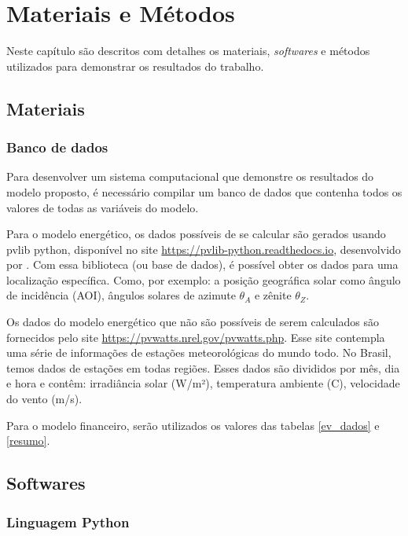 \chapter{Materiais e Métodos}\label{desenvolvimento}

Neste capítulo são descritos com detalhes os materiais, \textit{softwares} e métodos utilizados para demonstrar os resultados do trabalho.

\section{Materiais}

\subsection{Banco de dados}

Para desenvolver um sistema computacional que demonstre os resultados do modelo proposto, é necessário compilar um banco de dados que contenha todos os valores de todas as variáveis do modelo.

Para o modelo energético, os dados possíveis de se calcular são gerados usando pvlib python, disponível no site \url{https://pvlib-python.readthedocs.io}, desenvolvido por \cite{pvlib}. Com essa biblioteca (ou base de dados), é possível obter os dados para uma localização específica. Como, por exemplo: a posição geográfica solar como ângulo de incidência (AOI), ângulos solares de azimute $\theta_A$ e zênite $\theta_Z$.

Os dados do modelo energético que não são possíveis de serem calculados são fornecidos pelo site \url{https://pvwatts.nrel.gov/pvwatts.php}. Esse site contempla uma série de informações de estações meteorológicas do mundo todo. No Brasil, temos dados de estações em todas regiões. Esses dados são divididos por mês, dia e hora e contêm: irradiância solar (W/m²), temperatura ambiente (C), velocidade do vento (m/s).

Para o modelo financeiro, serão utilizados os valores das tabelas \ref{ev_dados} e \ref{resumo}.

\section{Softwares}

\subsection{Linguagem Python}

